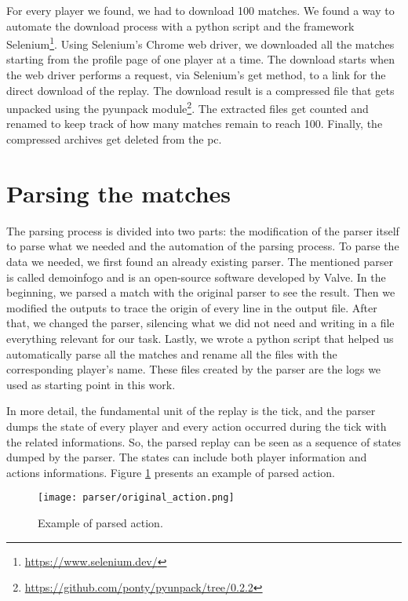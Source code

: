 	For every player we found, we had to download 100 matches. 
	We found a way to automate the download process with a python script and the framework Selenium\footnote{\href{https://www.selenium.dev/}{https://www.selenium.dev/}}. 
	Using Selenium's Chrome web driver, we downloaded all the matches starting from the profile page of one player at a time. 
	The download starts when the web driver performs a request, via Selenium's get method, to a link for the direct download of the replay. 
	The download result is a compressed file that gets unpacked using the pyunpack module\footnote{\href{https://github.com/ponty/pyunpack/tree/0.2.2}{https://github.com/ponty/pyunpack/tree/0.2.2}}. 
	The extracted files get counted and renamed to keep track of how many matches remain to reach 100. 
	Finally, the compressed archives get deleted from the pc.

\section{\label{sec:pa}Parsing the matches}

	The parsing process is divided into two parts: the modification of the parser itself to parse what we needed and the automation of the parsing process.
	To parse the data we needed, we first found an already existing parser. 
	The mentioned parser is called demoinfogo and is an open-source software developed by Valve. 
	In the beginning, we parsed a match with the original parser to see the result. 
	Then we modified the outputs to trace the origin of every line in the output file. 
	After that, we changed the parser, silencing what we did not need and writing in a file everything relevant for our task. 
	Lastly, we wrote a python script that helped us automatically parse all the matches and rename all the files with the corresponding player's name. 
	These files created by the parser are the logs we used as starting point in this work.

	In more detail, the fundamental unit of the replay is the \gls{tick}, and the parser dumps the state of every player and every action occurred during the tick with the related informations. 
	So, the parsed replay can be seen as a sequence of states dumped by the parser. 
	The states can include both player information and actions informations.
	Figure \ref{fig:act} presents an example of parsed action.
	
	\begin{figure}[!h] 
		\centering 
		\texttt{[image: parser/original\_action.png]}
		\caption{\label{fig:act}Example of parsed action.}
	\end{figure}
	
